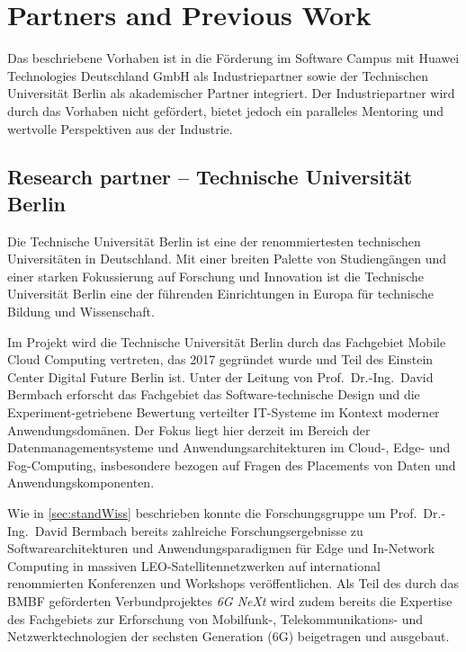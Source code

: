 \clearpage
\section{Partners and Previous Work}
\label{sec:partner}

Das beschriebene Vorhaben ist in die Förderung im Software Campus mit Huawei Technologies Deutschland GmbH als Industriepartner sowie der Technischen Universität Berlin als akademischer Partner integriert.
Der Industriepartner wird durch das Vorhaben nicht gefördert, bietet jedoch ein paralleles Mentoring und wertvolle Perspektiven aus der Industrie.

\subsection{Research partner -- Technische Universität Berlin}
\label{sec:partner:tub}

Die Technische Universität Berlin ist eine der renommiertesten technischen Universitäten in Deutschland.
Mit einer breiten Palette von Studiengängen und einer starken Fokussierung auf Forschung und Innovation ist die Technische Universität Berlin eine der führenden Einrichtungen in Europa für technische Bildung und Wissenschaft.

Im Projekt wird die Technische Universität Berlin durch das Fachgebiet Mobile Cloud Computing vertreten, das 2017 gegründet wurde und Teil des Einstein Center Digital Future Berlin ist.
Unter der Leitung von Prof.~Dr.-Ing.~David Bermbach erforscht das Fachgebiet das Software-technische Design und die Experiment-getriebene Bewertung verteilter IT-Systeme im Kontext moderner Anwendungsdomänen.
Der Fokus liegt hier derzeit im Bereich der Datenmanagementsysteme und Anwendungsarchitekturen im Cloud-, Edge- und Fog-Computing, insbesondere bezogen auf Fragen des Placements von Daten und Anwendungskomponenten.

Wie in \cref{sec:standWiss} beschrieben konnte die Forschungsgruppe um Prof.~Dr.-Ing.~David Bermbach bereits zahlreiche Forschungsergebnisse zu Softwarearchitekturen und Anwendungsparadigmen für Edge und In-Network Computing in massiven LEO-Satellitennetzwerken auf international renommierten Konferenzen und Workshops veröffentlichen.
Als Teil des durch das BMBF geförderten Verbundprojektes \emph{6G NeXt} wird zudem bereits die Expertise des Fachgebiets zur Erforschung von Mobilfunk-, Telekommunikations- und Netzwerktechnologien der sechsten Generation (6G) beigetragen und ausgebaut.

